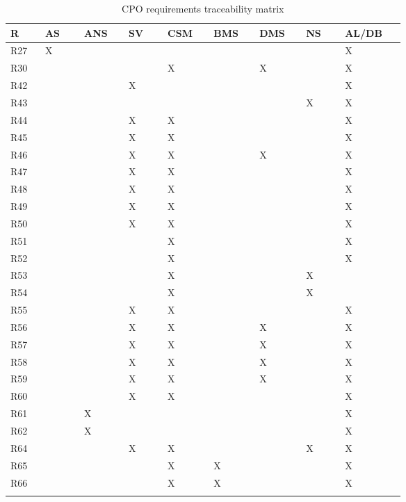 \begin{center}
    \begin{longtable}[H]{|p{0.05\linewidth}|p{0.075\linewidth}|p{0.075\linewidth}|p{0.075\linewidth}|p{0.075\linewidth}|p{0.075\linewidth}|p{0.075\linewidth}|p{0.075\linewidth}|p{0.085\linewidth}|}
     \hline
     \textbf{R} & 
     \textbf{AS} & 
     \textbf{ANS} & 
     \textbf{SV} & 
     \textbf{CSM} & 
     \textbf{BMS} & 
     \textbf{DMS} & 
     \textbf{NS} & 
     \textbf{AL/DB}\\
     \hline
     R27 & X & & & & & & & X \\
     \hline
     R30 & & & & X & & X & & X \\
     \hline
     R42 & & & X & & & & & X \\
     \hline
     R43 & & & & & & & X & X \\
     \hline
     R44 & & & X & X & & & & X \\
     \hline
     R45 & & & X & X & & & & X\\
     \hline
     R46 & & & X & X & & X & & X\\
     \hline
     R47 & & & X & X & & & & X\\
     \hline
     R48 & & & X & X & & & & X\\
     \hline
     R49 & & & X & X & & & & X\\
     \hline
     R50 & & & X & X & & & & X\\
     \hline
     R51 & & & & X & & & & X\\
     \hline
     R52 & & & & X & & & & X\\
     \hline
     R53 & & & & X & & & X & \\
     \hline
     R54 & & & & X & & & X & \\
     \hline
     R55 & & & X & X & & & & X\\
     \hline
     R56 & & & X & X & & X & & X\\
     \hline
     R57 & & & X & X & & X & & X\\
     \hline
     R58 & & & X & X & & X & & X\\
     \hline
     R59 & & & X & X & & X & & X\\
     \hline
     R60 & & & X & X & & & & X\\
     \hline
     R61 & & X & & & & & & X\\
     \hline
     R62 & & X & & & & & & X\\
     \hline
     R64 & & & X & X & & & X & X\\
     \hline
     R65 & & & & X & X & & & X\\
     \hline
     R66 & & & & X & X & & & X\\
     \hline
    \caption{CPO requirements traceability matrix}
    \label{tab:CPO requirements traceability}
    \end{longtable}
\end{center}
